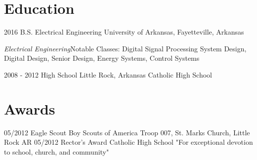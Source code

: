 \documentclass[]{friggeri-cv}
\begin{document}
\section{Education}
\begin{entrylist}
  \entry
    {2016}
    {B.S. Electrical Engineering}
    {University of Arkansas, Fayetteville, Arkansas}
    {\raggedright{\textit{Electrical Engineering}}\break Notable Classes: Digital Signal Processing System Design, Digital Design, Senior Design, Energy Systems, Control Systems\\}

  \entry
    {2008 - 2012}
    {High School}
    {Little Rock, Arkansas}
    {Catholic High School}
\end{entrylist}

\section{Awards}
\begin{entrylist}
  \entry
    {05/2012}
    {Eagle Scout}
    {Boy Scouts of America}
    {Troop 007, St. Marks Church, Little Rock AR}
  \entry
    {05/2012}
    {Rector's Award}
    {Catholic High School}
    {"For exceptional devotion to school, church, and community"}
\end{entrylist}
\end{document}
